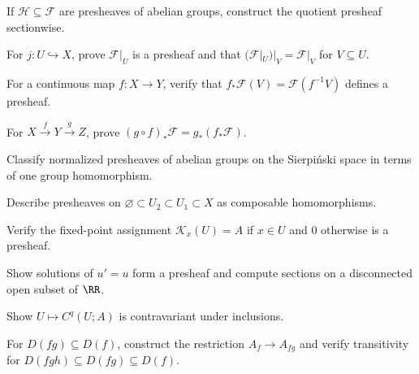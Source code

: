 \begin{exercise}
If $\mathcal H\subseteq\mathcal F$ are presheaves of abelian groups, construct the quotient presheaf sectionwise.
\end{exercise}

\begin{exercise}
For $j:U\hookrightarrow X$, prove $\mathcal F|_U$ is a presheaf and that $(\mathcal F|_U)|_V=\mathcal F|_V$ for $V\subseteq U$.
\end{exercise}

\begin{exercise}
For a continuous map $f:X\to Y$, verify that $f_*\mathcal F(V)=\mathcal F(f^{-1}V)$ defines a presheaf.
\end{exercise}

\begin{exercise}
For $X\xrightarrow fY\xrightarrow gZ$, prove $(g\circ f)_*\mathcal F=g_*(f_*\mathcal F)$.
\end{exercise}

\begin{exercise}
Classify normalized presheaves of abelian groups on the Sierpiński space in terms of one group homomorphism.
\end{exercise}

\begin{exercise}
Describe presheaves on $\varnothing\subset U_2\subset U_1\subset X$ as composable homomorphisms.
\end{exercise}

\begin{exercise}
Verify the fixed-point assignment $\mathcal K_x(U)=A$ if $x\in U$ and $0$ otherwise is a presheaf.
\end{exercise}

\begin{exercise}
Show solutions of $u'=u$ form a presheaf and compute sections on a disconnected open subset of $\RR$.
\end{exercise}

\begin{exercise}
Show $U\mapsto C^q(U;A)$ is contravariant under inclusions.
\end{exercise}

\begin{exercise}
For $D(fg)\subseteq D(f)$, construct the restriction $A_f\to A_{fg}$ and verify transitivity for $D(fgh)\subseteq D(fg)\subseteq D(f)$.
\end{exercise}

